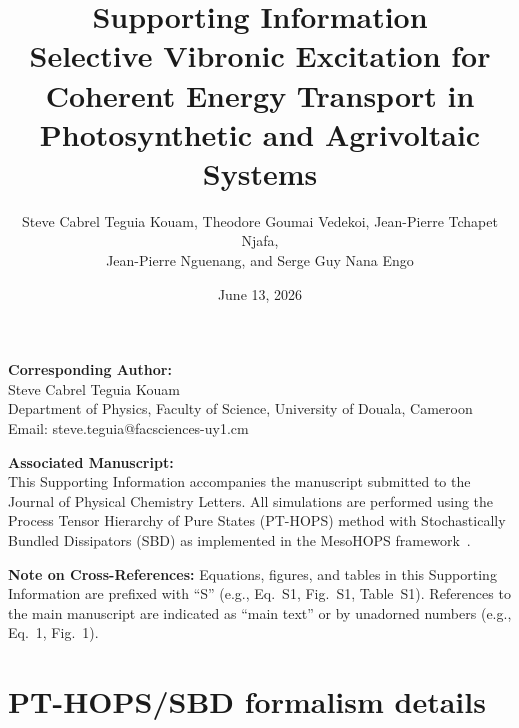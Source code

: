 \documentclass[11pt,a4paper]{article}
\begin{document}
\title{\textbf{Supporting Information}\\[0.5em]
\large Selective Vibronic Excitation for Coherent Energy Transport in Photosynthetic and Agrivoltaic Systems}

\author{Steve Cabrel Teguia Kouam, Theodore Goumai Vedekoi, Jean-Pierre Tchapet Njafa,\\ Jean-Pierre Nguenang, and Serge Guy Nana Engo}

\date{June 13, 2026}

\maketitle

\noindent\textbf{Corresponding Author:}\\
Steve Cabrel Teguia Kouam\\
Department of Physics, Faculty of Science, University of Douala, Cameroon\\
Email: steve.teguia@facsciences-uy1.cm

\vspace{1em}
\noindent\textbf{Associated Manuscript:}\\
This Supporting Information accompanies the manuscript submitted to the Journal of Physical Chemistry Letters. All simulations are performed using the Process Tensor Hierarchy of Pure States (PT-HOPS) method with Stochastically Bundled Dissipators (SBD) as implemented in the MesoHOPS framework~\cite{Varvelo2021,Citty2024}.

\tableofcontents

\newpage

\noindent\textbf{Note on Cross-References:} Equations, figures, and tables in this Supporting Information are prefixed with ``S'' (e.g., Eq.~S1, Fig.~S1, Table~S1). References to the main manuscript are indicated as ``main text'' or by unadorned numbers (e.g., Eq.~1, Fig.~1).

\vspace{1em}


\section{PT-HOPS/SBD formalism details}
\label{sec:formalism}
\end{document}
